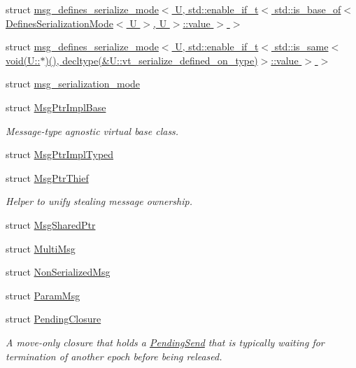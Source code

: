 \begin{DoxyCompactItemize}
\item 
struct \hyperlink{structvt_1_1messaging_1_1msg__defines__serialize__mode_3_01_u_00_01std_1_1enable__if__t_3_01std_8698c5f7a65cc513c46123d196b4add1}{msg\+\_\+defines\+\_\+serialize\+\_\+mode$<$ U, std\+::enable\+\_\+if\+\_\+t$<$ std\+::is\+\_\+base\+\_\+of$<$ Defines\+Serialization\+Mode$<$ U $>$, U $>$\+::value $>$ $>$}
\item 
struct \hyperlink{structvt_1_1messaging_1_1msg__defines__serialize__mode_3_01_u_00_01std_1_1enable__if__t_3_01std_9ff39ec7a2238fd9d7cc614da26fbe04}{msg\+\_\+defines\+\_\+serialize\+\_\+mode$<$ U, std\+::enable\+\_\+if\+\_\+t$<$ std\+::is\+\_\+same$<$ void(\+U\+::$\ast$)(), decltype(\&\+U\+::vt\+\_\+serialize\+\_\+defined\+\_\+on\+\_\+type)$>$\+::value $>$ $>$}
\item 
struct \hyperlink{structvt_1_1messaging_1_1msg__serialization__mode}{msg\+\_\+serialization\+\_\+mode}
\item 
struct \hyperlink{structvt_1_1messaging_1_1_msg_ptr_impl_base}{Msg\+Ptr\+Impl\+Base}
\begin{DoxyCompactList}\small\item\em Message-\/type agnostic virtual base class. \end{DoxyCompactList}\item 
struct \hyperlink{structvt_1_1messaging_1_1_msg_ptr_impl_typed}{Msg\+Ptr\+Impl\+Typed}
\item 
struct \hyperlink{structvt_1_1messaging_1_1_msg_ptr_thief}{Msg\+Ptr\+Thief}
\begin{DoxyCompactList}\small\item\em Helper to unify \textquotesingle{}stealing\textquotesingle{} message ownership. \end{DoxyCompactList}\item 
struct \hyperlink{structvt_1_1messaging_1_1_msg_shared_ptr}{Msg\+Shared\+Ptr}
\item 
struct \hyperlink{structvt_1_1messaging_1_1_multi_msg}{Multi\+Msg}
\item 
struct \hyperlink{structvt_1_1messaging_1_1_non_serialized_msg}{Non\+Serialized\+Msg}
\item 
struct \hyperlink{structvt_1_1messaging_1_1_param_msg}{Param\+Msg}
\item 
struct \hyperlink{structvt_1_1messaging_1_1_pending_closure}{Pending\+Closure}
\begin{DoxyCompactList}\small\item\em A move-\/only closure that holds a {\ttfamily \hyperlink{structvt_1_1messaging_1_1_pending_send}{Pending\+Send}} that is typically waiting for termination of another epoch before being released. \end{DoxyCompactList}\item 

\end{DoxyCompactItemize}
